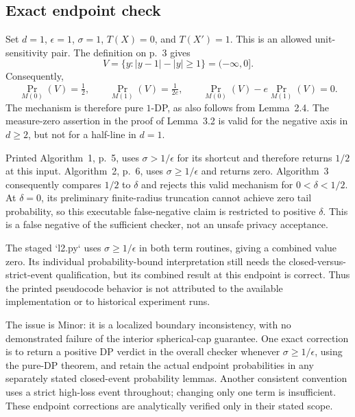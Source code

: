 \documentclass[10pt]{article}
\begin{document}
\subsection*{Exact endpoint check}
Set \(d=1\), \(\epsilon=1\), \(\sigma=1\), \(T(X)=0\), and \(T(X')=1\). This is an allowed unit-sensitivity pair. The definition on p. 3 gives \[V=\{y:|y-1|-|y|\geq1\}=(-\infty,0].\] Consequently, \[\Pr_{M(0)}(V)=\tfrac12,\qquad
 \Pr_{M(1)}(V)=\tfrac{1}{2e},\qquad
 \Pr_{M(0)}(V)-e\Pr_{M(1)}(V)=0.\] The mechanism is therefore pure \(1\)-DP, as also follows from Lemma 2.4. The measure-zero assertion in the proof of Lemma 3.2 is valid for the negative axis in \(d\geq2\), but not for a half-line in \(d=1\).\par
Printed Algorithm 1, p. 5, uses \(\sigma>1/\epsilon\) for its shortcut and therefore returns \(1/2\) at this input. Algorithm 2, p. 6, uses \(\sigma\geq1/\epsilon\) and returns zero. Algorithm 3 consequently compares \(1/2\) to \(\delta\) and rejects this valid mechanism for \(0<\delta<1/2\). At \(\delta=0\), its preliminary finite-radius truncation cannot achieve zero tail probability, so this executable false-negative claim is restricted to positive \(\delta\). This is a false negative of the sufficient checker, not an unsafe privacy acceptance.\par
The staged `l2.py` uses \(\sigma\geq1/\epsilon\) in both term routines, giving a combined value zero. Its individual probability-bound interpretation still needs the closed-versus-strict-event qualification, but its combined result at this endpoint is correct. Thus the printed pseudocode behavior is not attributed to the available implementation or to historical experiment runs.\par
The issue is Minor: it is a localized boundary inconsistency, with no demonstrated failure of the interior spherical-cap guarantee. One exact correction is to return a positive DP verdict in the overall checker whenever \(\sigma\geq1/\epsilon\), using the pure-DP theorem, and retain the actual endpoint probabilities in any separately stated closed-event probability lemmas. Another consistent convention uses a strict high-loss event throughout; changing only one term is insufficient. These endpoint corrections are analytically verified only in their stated scope.\par
\end{document}
